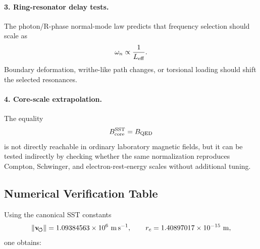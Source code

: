     \paragraph{3. Ring-resonator delay tests.}
        The photon/R-phase normal-mode law predicts that frequency selection
        should scale as
        \[
            \omega_n
            \propto
            \frac{1}{L_{\rm eff}}.
        \]
        Boundary deformation, writhe-like path changes, or torsional loading
        should shift the selected resonances.
    
    \paragraph{4. Core-scale extrapolation.}
        The equality
        \[
            B_{\rm core}^{\rm SST}=B_{\rm QED}
        \]
        is not directly reachable in ordinary laboratory magnetic fields, but it
        can be tested indirectly by checking whether the same normalization
        reproduces Compton, Schwinger, and electron-rest-energy scales without
        additional tuning.

\subsection{Numerical Verification Table}

Using the canonical SST constants
\[
    \lVert\mathbf{v}_{\!\boldsymbol{\circlearrowleft}}\rVert=1.09384563\times10^6\ {\rm m\,s^{-1}},
    \qquad
    r_c=1.40897017\times10^{-15}\ {\rm m},
\]
one obtains:


